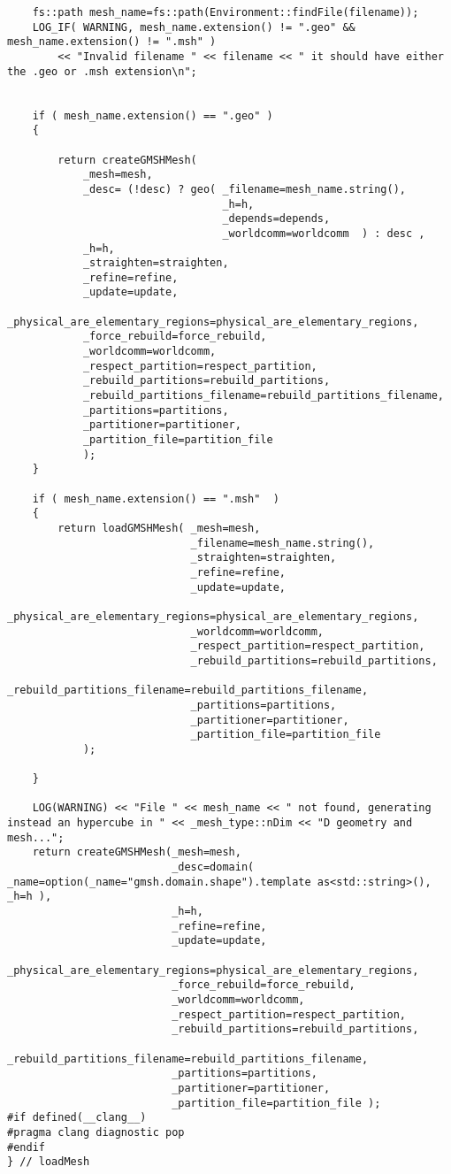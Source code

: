 \documentclass[12pt]{article}
\begin{document}
\begin{lstlisting}
    fs::path mesh_name=fs::path(Environment::findFile(filename));
    LOG_IF( WARNING, mesh_name.extension() != ".geo" && mesh_name.extension() != ".msh" )
        << "Invalid filename " << filename << " it should have either the .geo or .msh extension\n";


    if ( mesh_name.extension() == ".geo" )
    {

        return createGMSHMesh(
            _mesh=mesh,
            _desc= (!desc) ? geo( _filename=mesh_name.string(),
                                  _h=h,
                                  _depends=depends,
                                  _worldcomm=worldcomm  ) : desc ,
            _h=h,
            _straighten=straighten,
            _refine=refine,
            _update=update,
            _physical_are_elementary_regions=physical_are_elementary_regions,
            _force_rebuild=force_rebuild,
            _worldcomm=worldcomm,
            _respect_partition=respect_partition,
            _rebuild_partitions=rebuild_partitions,
            _rebuild_partitions_filename=rebuild_partitions_filename,
            _partitions=partitions,
            _partitioner=partitioner,
            _partition_file=partition_file
            );
    }

    if ( mesh_name.extension() == ".msh"  )
    {
        return loadGMSHMesh( _mesh=mesh,
                             _filename=mesh_name.string(),
                             _straighten=straighten,
                             _refine=refine,
                             _update=update,
                             _physical_are_elementary_regions=physical_are_elementary_regions,
                             _worldcomm=worldcomm,
                             _respect_partition=respect_partition,
                             _rebuild_partitions=rebuild_partitions,
                             _rebuild_partitions_filename=rebuild_partitions_filename,
                             _partitions=partitions,
                             _partitioner=partitioner,
                             _partition_file=partition_file
            );

    }

    LOG(WARNING) << "File " << mesh_name << " not found, generating instead an hypercube in " << _mesh_type::nDim << "D geometry and mesh...";
    return createGMSHMesh(_mesh=mesh,
                          _desc=domain( _name=option(_name="gmsh.domain.shape").template as<std::string>(), _h=h ),
                          _h=h,
                          _refine=refine,
                          _update=update,
                          _physical_are_elementary_regions=physical_are_elementary_regions,
                          _force_rebuild=force_rebuild,
                          _worldcomm=worldcomm,
                          _respect_partition=respect_partition,
                          _rebuild_partitions=rebuild_partitions,
                          _rebuild_partitions_filename=rebuild_partitions_filename,
                          _partitions=partitions,
                          _partitioner=partitioner,
                          _partition_file=partition_file );
#if defined(__clang__)
#pragma clang diagnostic pop
#endif
} // loadMesh
\end{lstlisting}
\end{document}
